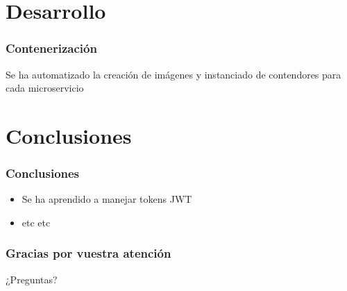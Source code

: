 \documentclass{beamer}
\begin{document}
	\section{Desarrollo}
	
	\begin{frame}
		\frametitle{Contenerización}
		Se ha automatizado la creación de imágenes y instanciado de contendores para cada microservicio
	
	\end{frame}
	
	\section{Conclusiones}
	
	\begin{frame}
		\frametitle{Conclusiones}
		\begin{itemize}
			\item Se ha aprendido a manejar tokens JWT
			\item etc etc
		\end{itemize}
	\end{frame}
	
	\begin{frame}
		\frametitle{Gracias por vuestra atención}
		¿Preguntas?
	\end{frame}
	
\end{document}
